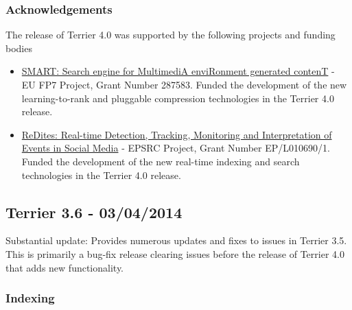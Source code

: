 \subsubsection{Acknowledgements}\label{acknowledgements-1}

The release of Terrier 4.0 was supported by the following projects and
funding bodies

\begin{itemize}
\tightlist
\item
  \href{http://www.smartfp7.eu/}{SMART: Search engine for MultimediA
  enviRonment generated contenT} - EU FP7 Project, Grant Number 287583.
  Funded the development of the new learning-to-rank and pluggable
  compression technologies in the Terrier 4.0 release.
\item
  \href{http://demeter.inf.ed.ac.uk/redites/}{ReDites: Real-time
  Detection, Tracking, Monitoring and Interpretation of Events in Social
  Media} - EPSRC Project, Grant Number EP/L010690/1. Funded the
  development of the new real-time indexing and search technologies in
  the Terrier 4.0 release.
\end{itemize}

\subsection{Terrier 3.6 - 03/04/2014}\label{terrier-3.6---03042014}

Substantial update: Provides numerous updates and fixes to issues in
Terrier 3.5. This is primarily a bug-fix release clearing issues before
the release of Terrier 4.0 that adds new functionality.

\subsubsection{Indexing}\label{indexing-2}

